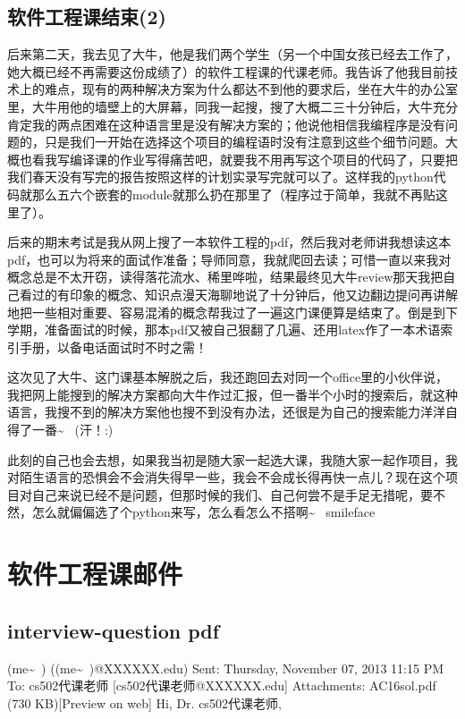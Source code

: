 \documentclass[12pt]{book}
\begin{document}
\section{软件工程课结束(2)}
\label{sec-32-2}

后来第二天，我去见了大牛，他是我们两个学生（另一个中国女孩已经去工作了，她大概已经不再需要这份成绩了）的软件工程课的代课老师。我告诉了他我目前技术上的难点，现有的两种解决方案为什么都达不到他的要求后，坐在大牛的办公室里，大牛用他的墙壁上的大屏幕，同我一起搜，搜了大概二三十分钟后，大牛充分肯定我的两点困难在这种语言里是没有解决方案的；他说他相信我编程序是没有问题的，只是我们一开始在选择这个项目的编程语时没有注意到这些个细节问题。大概也看我写编译课的作业写得痛苦吧，就要我不用再写这个项目的代码了，只要把我们春天没有写完的报告按照这样的计划实录写完就可以了。这样我的python代码就那么五六个嵌套的module就那么扔在那里了（程序过于简单，我就不再贴这里了）。

后来的期末考试是我从网上搜了一本软件工程的pdf，然后我对老师讲我想读这本pdf，也可以为将来的面试作准备；导师同意，我就爬回去读；可惜一直以来我对概念总是不太开窃，读得落花流水、稀里哗啦，结果最终见大牛review那天我把自己看过的有印象的概念、知识点漫天海聊地说了十分钟后，他又边翻边提问再讲解地把一些相对重要、容易混淆的概念帮我过了一遍这门课便算是结束了。倒是到下学期，准备面试的时候，那本pdf又被自己狠翻了几遍、还用latex作了一本术语索引手册，以备电话面试时不时之需！

这次见了大牛、这门课基本解脱之后，我还跑回去对同一个office里的小伙伴说，我把网上能搜到的解决方案都向大牛作过汇报，但一番半个小时的搜索后，就这种语言，我搜不到的解决方案他也搜不到没有办法，还很是为自己的搜索能力洋洋自得了一番\textasciitilde{}~ (汗！:)

此刻的自己也会去想，如果我当初是随大家一起选大课，我随大家一起作项目，我对陌生语言的恐惧会不会消失得早一些，我会不会成长得再快一点儿？现在这个项目对自己来说已经不是问题，但那时候的我们、自己何尝不是手足无措呢，要不然，怎么就偏偏选了个python来写，怎么看怎么不搭啊\textasciitilde{}~  smileface

\chapter{软件工程课邮件}
\label{sec-33}

\section{interview-question pdf}
\label{sec-33-1}
 (me\textasciitilde{}~) ((me\textasciitilde{}~)@XXXXXX.edu)
Sent:         Thursday, November 07, 2013 11:15 PM
To:        
cs502代课老师 [cs502代课老师@XXXXXX.edu]
Attachments:        
AC16\textunderscore sol.pdf‎ (730 KB‎)[Preview on web]
Hi, Dr. cs502代课老师, 
\end{document}

